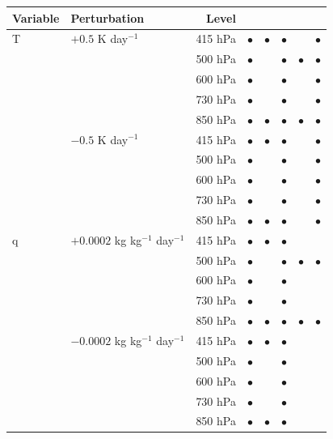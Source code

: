 \documentclass[draft]{agujournal2019}
\begin{document}
{\begin{table}[h!]
\begin{tabular}{llr|cc|ccc}
        \textbf{Variable} & \textbf{Perturbation} & \textbf{Level} & & & & & \\
        \hline
        T & $+0.5$ K day$^{-1}$ & 415 hPa & $\bullet{}$ & $\bullet{}$ & $\bullet{}$ &  & $\bullet{}$ \\
        & & 500 hPa & $\bullet{}$ & & $\bullet{}$ & $\bullet{}$ & $\bullet{}$ \\
        & & 600 hPa & $\bullet{}$ & & $\bullet{}$ &  & $\bullet{}$ \\
        & & 730 hPa & $\bullet{}$ & & $\bullet{}$ &  & $\bullet{}$ \\
        & & 850 hPa & $\bullet{}$ & $\bullet{}$ & $\bullet{}$ & $\bullet{}$ & $\bullet{}$ \\
        & $-0.5$ K day$^{-1}$ & 415 hPa & $\bullet{}$ & $\bullet{}$ & $\bullet{}$ &  & $\bullet{}$ \\
        & & 500 hPa & $\bullet{}$ & & $\bullet{}$ &  & $\bullet{}$\\
        & & 600 hPa & $\bullet{}$ & & $\bullet{}$ &  & $\bullet{}$ \\
        & & 730 hPa & $\bullet{}$ & & $\bullet{}$ &  & $\bullet{}$ \\
        & & 850 hPa & $\bullet{}$ & $\bullet{}$ & $\bullet{}$ &  & $\bullet{}$ \\
        \hline
        q & $+0.0002$ kg kg$^{-1}$ day$^{-1}$ & 415 hPa & $\bullet{}$ & $\bullet{}$ & $\bullet{}$ &  &  \\
        & & 500 hPa & $\bullet{}$ & & $\bullet{}$ & $\bullet{}$ & $\bullet{}$ \\
        & & 600 hPa & $\bullet{}$ & & $\bullet{}$ &  &  \\
        & & 730 hPa & $\bullet{}$ & & $\bullet{}$ &  &  \\
        & & 850 hPa & $\bullet{}$ & $\bullet{}$ & $\bullet{}$ & $\bullet{}$ & $\bullet{}$ \\
        & $-0.0002$ kg kg$^{-1}$ day$^{-1}$& 415 hPa & $\bullet{}$ & $\bullet{}$ & $\bullet{}$ &  &  \\
        & & 500 hPa & $\bullet{}$ & & $\bullet{}$ &  &  \\
        & & 600 hPa & $\bullet{}$ & & $\bullet{}$ &  &  \\
        & & 730 hPa & $\bullet{}$ & & $\bullet{}$ &  &  \\
        & & 850 hPa & $\bullet{}$ & $\bullet{}$ & $\bullet{}$ &  &  \\
        \hline
    \end{tabular}
\end{table}
}
\end{document}
